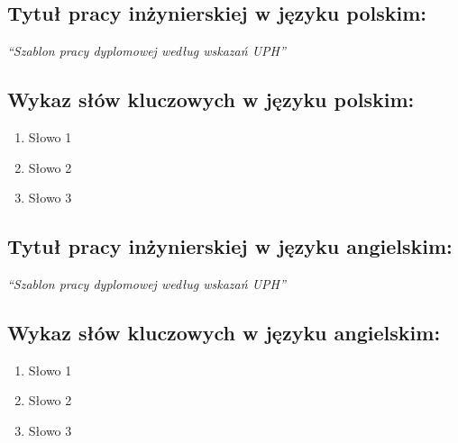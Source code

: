 \subsection*{Tytuł pracy inżynierskiej w języku polskim:}


\textit{``Szablon pracy dyplomowej według wskazań UPH''}

\subsection*{Wykaz słów kluczowych w języku polskim:}

\begin{enumerate}
  \item Słowo 1
  \item Słowo 2
  \item Słowo 3
\end{enumerate}

\subsection*{Tytuł pracy inżynierskiej w języku angielskim:}

\textit{``Szablon pracy dyplomowej według wskazań UPH''}

\subsection*{Wykaz słów kluczowych w języku angielskim:}

\begin{enumerate}
  \item Słowo 1
  \item Słowo 2
  \item Słowo 3
\end{enumerate}


